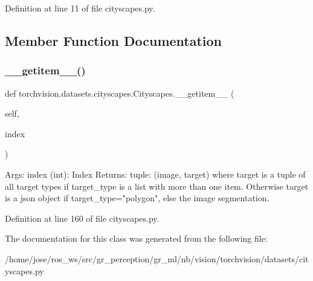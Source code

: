 Definition at line 11 of file cityscapes.\+py.



\subsection{Member Function Documentation}
\mbox{\label{classtorchvision_1_1datasets_1_1cityscapes_1_1Cityscapes_ac445ee4a51a6c6110dfc6d86f52cf0bf}} 
\subsubsection{\texorpdfstring{\+\_\+\+\_\+getitem\+\_\+\+\_\+()}{\_\_getitem\_\_()}}
{\footnotesize\ttfamily def torchvision.\+datasets.\+cityscapes.\+Cityscapes.\+\_\+\+\_\+getitem\+\_\+\+\_\+ (\begin{DoxyParamCaption}\item[{}]{self,  }\item[{}]{index }\end{DoxyParamCaption})}

\begin{DoxyVerb}Args:
    index (int): Index
Returns:
    tuple: (image, target) where target is a tuple of all target types if target_type is a list with more
    than one item. Otherwise target is a json object if target_type="polygon", else the image segmentation.
\end{DoxyVerb}
 

Definition at line 160 of file cityscapes.\+py.



The documentation for this class was generated from the following file\+:\begin{DoxyCompactItemize}
\item 
/home/jose/ros\+\_\+ws/src/gr\+\_\+perception/gr\+\_\+ml/nb/vision/torchvision/datasets/cityscapes.\+py\end{DoxyCompactItemize}

